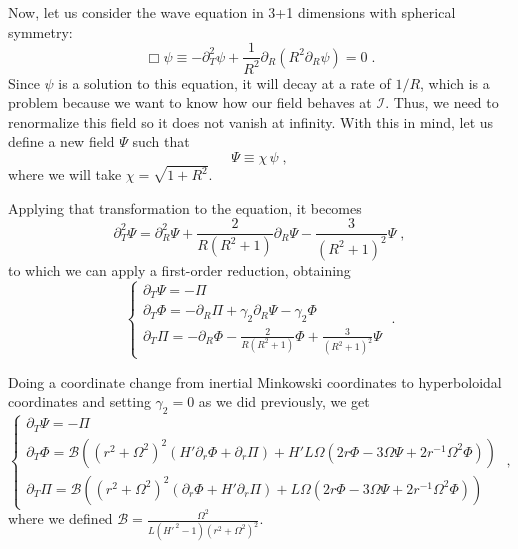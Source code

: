 Now, let us consider the wave equation in 3+1 dimensions with spherical symmetry:
%
\begin{equation}
    \Box \psi \equiv - \partial_T^2 \psi + \frac{1}{R^2} \partial_R\left( R^2 \partial_R \psi\right) = 0 \;.
\end{equation}
%
Since $\psi$ is a solution to this equation, it will decay at a rate of $1/R$, which is a problem because we want to know how our field behaves at $\mathscr{I}$. Thus, we need to renormalize this field so it does not vanish at infinity. With this in mind, let us define a new field $\Psi$ such that
%
\begin{equation}
    \Psi \equiv \chi \, \psi \; ,
\end{equation}
%
where we will take $\chi = \sqrt{1+R^2}$.

Applying that transformation to the equation, it becomes
%
\begin{equation}
    \partial_T^2 \Psi = \partial_R^2\Psi + \frac{2}{R(R^2+1)} \partial_R\Psi - \frac{3}{(R^2+1)^2} \Psi \;,
\end{equation}
%
to which we can apply a first-order reduction, obtaining
%
\begin{equation}
    \left\{ \begin{array}{l} 
        \partial_T \Psi = - \Pi \\ 
        \partial_T \Phi = - \partial_R \Pi + \gamma_2 \partial_R \Psi - \gamma_2\Phi\\
        \partial_T \Pi = - \partial_R \Phi - \frac{2}{R(R^2+1)}\Phi + \frac{3}{(R^2+1)^2} \Psi
    \end{array} \right. \; .
\end{equation}

Doing a coordinate change from inertial Minkowski coordinates to hyperboloidal coordinates and setting $\gamma_2 = 0$ as we did previously, we get
%
\begin{equation}
    \left\{ \begin{array}{l} 
        \partial_T \Psi = - \Pi \\ 
        \partial_T \Phi = \mathcal{B}\left((r^2 + \Omega^2)^2 \left(H' \partial_r \Phi + \partial_r\Pi\right) + H' L \Omega \left( 2r\Phi - 3 \Omega \Psi + 2 r^{-1} \Omega^2 \Phi\right)\right)\\
        \partial_T \Pi = \mathcal{B}\left((r^2 + \Omega^2)^2 \left(\partial_r \Phi + H' \partial_r\Pi\right) + L \Omega \left( 2r\Phi - 3 \Omega \Psi + 2 r^{-1} \Omega^2 \Phi\right)\right)
    \end{array} \right. \; ,
\end{equation}
where we defined $\mathcal{B}= \frac{\Omega^2}{L(H'^{\,2}-1)(r^2 + \Omega^2)^2}$. 

